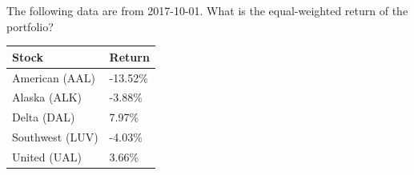 The following data are from 2017-10-01. What is the equal-weighted return of the portfolio?
\begin{center}
	\begin{tabular}{l|l}
		\textbf{Stock} & \textbf{Return} \\ \hline
		American (AAL) & -13.52\% \\
		Alaska (ALK) & -3.88\% \\
		Delta (DAL) & 7.97\% \\
		Southwest (LUV) & -4.03\% \\
		United (UAL) & 3.66\%\\\hline
	\end{tabular}
\end{center}
